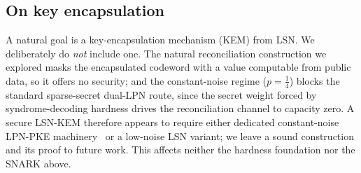 \documentclass[11pt,a4paper]{article}
\theoremstyle{plain}
\theoremstyle{definition}
\begin{document}
\subsection{On key encapsulation}
\label{sec:kem}

A natural goal is a key-encapsulation mechanism (KEM) from LSN. We deliberately do \emph{not} include one. The natural reconciliation construction we explored masks the encapsulated codeword with a value computable from public data, so it offers no security; and the constant-noise regime ($p=\tfrac14$) blocks the standard sparse-secret dual-LPN route, since the secret weight forced by syndrome-decoding hardness drives the reconciliation channel to capacity zero. A secure LSN-KEM therefore appears to require either dedicated constant-noise LPN-PKE machinery~\cite{YZ16} or a low-noise LSN variant; we leave a sound construction and its proof to future work. This affects neither the hardness foundation nor the SNARK above.
\end{document}
